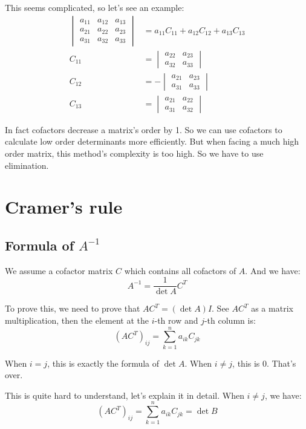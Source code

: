 \documentclass[10pt,a4paper,oneside,numbers=noenddot]{scrbook}
\theoremstyle{ctplain}
\theoremstyle{ctresult}
\begin{document}
This seems complicated, so let's see an example:
\begin{align*}
  \begin{vmatrix}
    a_{11} & a_{12} & a_{13} \\
    a_{21} & a_{22} & a_{23} \\
    a_{31} & a_{32} & a_{33}
  \end{vmatrix} &=
  a_{11}C_{11} + a_{12}C_{12} + a_{13}C_{13} \\
  C_{11} &= \begin{vmatrix}
    a_{22} & a_{23} \\
    a_{32} & a_{33}
  \end{vmatrix} \\
  C_{12} &= - \begin{vmatrix}
    a_{21} & a_{23} \\
    a_{31} & a_{33}
  \end{vmatrix} \\
  C_{13} &= \begin{vmatrix}
    a_{21} & a_{22} \\
    a_{31} & a_{32}
  \end{vmatrix}
\end{align*}

In fact cofactors decrease a matrix's order by 1. So we can use cofactors to calculate
low order determinants more efficiently. But when facing a much high order matrix, this
method's complexity is too high. So we have to use elimination.

\section{Cramer's rule}
\subsection{Formula of $A^{-1}$}

We assume a cofactor matrix $C$ which contains all cofactors of $A$. And we have:
\[
  A^{-1} = \frac{1}{\det A} C^{T}
\]

To prove this, we need to prove that $AC^{T} = (\det A)I$. See $AC^{T}$ as a matrix
multiplication, then the element at the $i$-th row and $j$-th column is:
\[
  (AC^{T})_{ij} = \sum_{k=1}^{n} a_{ik}C_{jk}
\]

When $i = j$, this is exactly the formula of $\det A$. When $i \neq j$, this is 0. That's
over.

This is quite hard to understand, let's explain it in detail. When $i \neq j$, we have:
\[
  (AC^{T})_{ij} = \sum_{k=1}^{n} a_{ik}C_{jk} =
  \det B
\]
\end{document}
